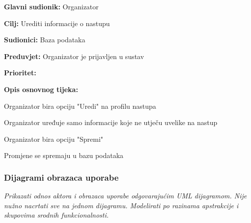 \noindent {}
	\begin{packed_item}
		
		\item \textbf{Glavni sudionik: } Organizator
		\item \textbf{Cilj:} Urediti informacije o nastupu
		\item \textbf{Sudionici:} Baza podataka
		\item \textbf{Preduvjet:} Organizator je prijavljen u sustav
		\item \textbf{Prioritet:} 
		\item \textbf{Opis osnovnog tijeka:} 
		
		\item[] \begin{packed_enum}
			
			\item Organizator bira opciju "Uredi" na profilu nastupa
			\item Organizator uređuje samo informacije koje ne utječu uvelike na nastup
			\item Organizator bira opciju "Spremi"
			\item Promjene se spremaju u bazu podataka
		\end{packed_enum}  
	\end{packed_item}
				
				\subsubsection{Dijagrami obrazaca uporabe}
				
				
				
					
					\textit{Prikazati odnos aktora i obrazaca uporabe odgovarajućim UML dijagramom. Nije nužno nacrtati sve na jednom dijagramu. Modelirati po razinama apstrakcije i skupovima srodnih funkcionalnosti.}
				\eject				
				
